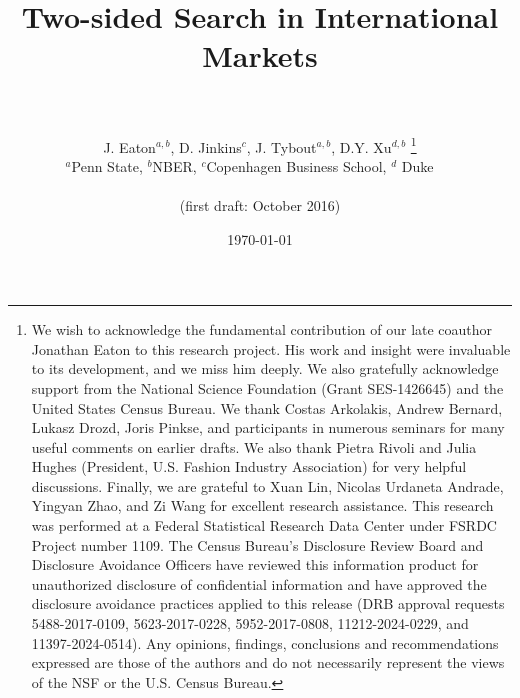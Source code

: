 \documentclass[12pt]{article} \usepackage{amsmath,amssymb,amsthm,geometry,graphicx,setspace,algorithm,algpseudocode,float}
\begin{document}
\title{\textbf{Two-sided Search in International Markets}\\
\ \ }
\author{J. Eaton$^{a,b}$, D. Jinkins$^{c}$, J. Tybout$^{a,b}$, D.Y. Xu$^{d,b}$%
\thanks{%
We wish to acknowledge the fundamental contribution of our late coauthor Jonathan Eaton to this research project. His work and insight were invaluable to its development, and we miss him deeply. We also gratefully acknowledge support from the National Science Foundation (Grant SES-1426645) and the United States Census Bureau. We thank Costas Arkolakis, Andrew Bernard, Lukasz Drozd, Joris Pinkse, and participants in numerous seminars for many useful comments on earlier drafts. We also thank Pietra Rivoli and Julia Hughes (President, U.S. Fashion Industry Association) for very helpful discussions. Finally, we are grateful to Xuan Lin, Nicolas Urdaneta Andrade, Yingyan Zhao, and Zi Wang for excellent research assistance. 
This research was performed at a Federal Statistical Research Data Center under FSRDC Project number 1109. The Census Bureau's Disclosure Review Board and Disclosure Avoidance Officers have reviewed this information product for unauthorized disclosure of confidential information and have approved the disclosure avoidance practices applied to this release (DRB approval requests 5488-2017-0109, 5623-2017-0228, 5952-2017-0808, 11212-2024-0229, and 11397-2024-0514). Any opinions, findings, conclusions and recommendations expressed are those of the authors and do not necessarily represent the views of the NSF or the U.S. Census Bureau. }\bigskip \\
$^{a}$Penn State, $^{b}$NBER, $^{c}$Copenhagen Business School, $^{d}$%
Duke\ \ \ 
\smallskip \\
\\ (first draft: October 2016) }
\date{\today}
\maketitle
\end{document}
